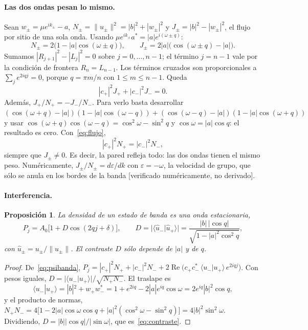 \documentclass[11pt,a4paper]{article}
\newtheorem{proposicion}{Proposición}
\theoremstyle{remark}
\newcommand{\re}{\operatorname{Re}}
\begin{document}
\paragraph{Las dos ondas pesan lo mismo.} Sean
$w_\pm=\mu e^{ik_\pm}-a$, $N_\pm=\|u_\pm\|^2=|b|^2+|w_\pm|^2$ y
$J_\pm=|b|^2-|w_\pm|^2$, el flujo por sitio de una sola onda. Usando
$\mu e^{ik_\pm}a^*=|a|e^{i(\omega\pm q)}$:
\begin{equation}
N_\pm=2\bigl(1-|a|\cos(\omega\pm q)\bigr),\qquad
J_\pm=2|a|\bigl(\cos(\omega\pm q)-|a|\bigr).
\end{equation}
Sumamos $|R_{j+1}|^2-|L_j|^2=0$ sobre $j=0,\dots,n-1$; el término $j=n-1$ vale
por la condición de frontera $R_n=L_{n-1}$. Los términos cruzados son
proporcionales a $\sum_je^{2iqj}=0$, porque $q=\pi m/n$ con $1\le m\le n-1$.
Queda
\begin{equation}
|c_+|^2J_+ + |c_-|^2J_-=0 .
\label{eq:flujo}
\end{equation}
Además, $J_+/N_+=-J_-/N_-$. Para verlo basta desarrollar
$(\cos(\omega+q)-|a|)(1-|a|\cos(\omega-q))+(\cos(\omega-q)-|a|)(1-|a|\cos(\omega+q))$
y usar $\cos(\omega+q)\cos(\omega-q)=\cos^2\omega-\sin^2q$ y
$\cos\omega=|a|\cos q$: el resultado es cero. Con~\eqref{eq:flujo},
\begin{equation}
|c_+|^2N_+=|c_-|^2N_- ,
\end{equation}
siempre que $J_\pm\neq0$. Es decir, la pared refleja todo: las dos ondas
tienen el mismo peso. Numéricamente, $J_\pm/N_\pm=d\varepsilon/dk$ con
$\varepsilon=-\omega$, la velocidad de grupo, que sólo se anula en los bordes de
la banda [verificado numéricamente, no derivado].

\paragraph{Interferencia.}
\begin{proposicion}\label{prop:contraste}
La densidad de un estado de banda es una onda estacionaria,
\begin{equation}
P_j=A_0\bigl[1+D\cos(2qj+\delta)\bigr],\qquad
D=\bigl|\langle\hat u_-|\hat u_+\rangle\bigr|=\frac{|b|\,|\cos q|}{\sqrt{1-|a|^2\cos^2q}},
\label{eq:contraste}
\end{equation}
con $\hat u_\pm=u_\pm/\|u_\pm\|$. El contraste $D$ sólo depende de $|a|$ y de $q$.
\end{proposicion}
\begin{proof}
De~\eqref{eq:psibanda},
$P_j=|c_+|^2N_++|c_-|^2N_-+2\re\bigl(c_+c_-^*\,\langle u_-|u_+\rangle\,e^{2iqj}\bigr)$.
Con pesos iguales, $D=|\langle u_-|u_+\rangle|/\sqrt{N_+N_-}$. El traslape es
\begin{equation}
\langle u_-|u_+\rangle=|b|^2+w_+w_-^*
=1+e^{2iq}-2|a|e^{iq}\cos\omega=2e^{iq}|b|^2\cos q ,
\end{equation}
y el producto de normas,
$N_+N_-=4\bigl[1-2|a|\cos\omega\cos q+|a|^2(\cos^2\omega-\sin^2q)\bigr]=4|b|^2\sin^2\omega$.
Dividiendo, $D=|b||\cos q|/|\sin\omega|$, que es~\eqref{eq:contraste}.
\end{proof}
\end{document}
